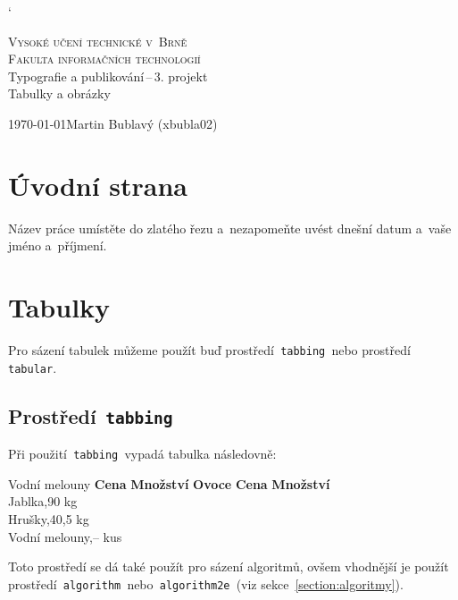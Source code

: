 \documentclass[a4paper, 11pt]{article}
\begin{document}
    \catcode`
    \begin{titlepage}
        \begin{center}
            \Huge
            \textsc{Vysoké učení technické v~Brně\\ Fakulta informačních technologií}\\
            \LARGE
                Typografie a publikování\,--\,3. projekt\\ \Huge Tabulky a obrázky\\
        \end{center}
        {\Large \today \hfill Martin Bublavý (xbubla02)}
    \end{titlepage}
    
    \section{Úvodní strana}
    
    Název práce umístěte do zlatého řezu a~nezapomeňte uvést dnešní datum a~vaše jméno a~příjmení.
    
    \section{Tabulky}
    
    Pro sázení tabulek můžeme použít buď prostředí\texttt{ tabbing }nebo prostředí\texttt{ tabular}.
    
    \subsection{Prostředí\texttt{ tabbing}}
    
    Při použití\texttt{ tabbing }vypadá tabulka následovně:
    \begin{tabbing}
		Vodní melouny \quad	\= \textbf{Cena} \quad \= \textbf{Množství}	\kill
		\textbf{Ovoce}\> \textbf{Cena}\> \textbf{Množství}\\
		Jablka,90 kg\\
		Hrušky,40,5 kg\\
		Vodní melouny,-- kus\\
	\end{tabbing}
	Toto prostředí se dá také použít pro sázení algoritmů, ovšem vhodnější je použít prostředí\texttt{ algorithm }nebo\texttt{ algorithm2e }(viz sekce~\ref{section:algoritmy}).
	
\end{document}
